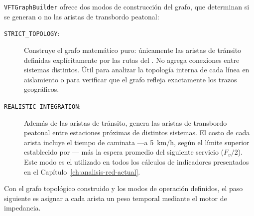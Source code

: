 \texttt{VFTGraphBuilder} ofrece dos modos de construcción del grafo, que
determinan si se generan o no las aristas de transbordo peatonal:

\begin{description}
    \item[\texttt{STRICT\_TOPOLOGY}:]
    Construye el grafo matemático puro: únicamente las aristas de tránsito
    definidas explícitamente por las rutas del \geojson{}. No agrega conexiones
    entre sistemas distintos. Útil para analizar la topología interna de cada
    línea en aislamiento o para verificar que el grafo refleja exactamente los
    trazos geográficos.

    \item[\texttt{REALISTIC\_INTEGRATION}:]
    Además de las aristas de tránsito, genera las aristas de transbordo peatonal
    entre estaciones próximas de distintos sistemas. El costo de cada arista
    incluye el tiempo de caminata —a 5~km/h, según el límite superior establecido
    por \citet{sedatu2019manual}— más la espera promedio del siguiente servicio
    ($F_v / 2$). Este modo es el utilizado en todos los cálculos de indicadores
    presentados en el Capítulo~\ref{ch:analisis-red-actual}.
\end{description}

Con el grafo topológico construido y los modos de operación definidos, el paso
siguiente es asignar a cada arista un peso temporal mediante el motor de
impedancia.
